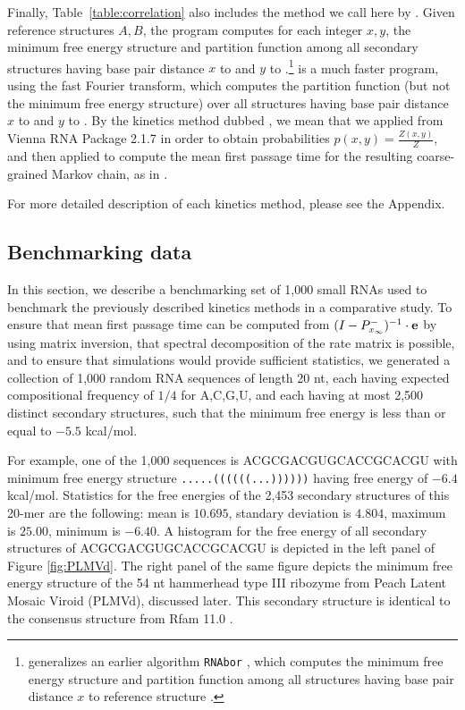 Finally, Table~\ref{table:correlation}
also includes the method we call here by \rnatwofold.
Given reference structures $A,B$, the \rnatwofold  program
\cite{hofacker:RNAbor2D,Lorenz.amb11} computes for each integer
$x,y$, the minimum free energy structure and partition function
among all secondary structures having base pair distance $x$ to \strA
and $y$ to \strB.\footnote{\rnatwofold generalizes an earlier algorithm
{\tt RNAbor} \cite{Freyhult.b07,Freyhult.nar07}, which computes the
minimum free energy structure and partition function among all structures
having base pair distance $x$ to reference structure \strA.}
\ffttwo \cite{Senter.jmb14} is a much faster program, using the
fast Fourier transform, which
computes the partition function (but not the minimum free energy
structure) over all structures having base pair distance $x$ to \strA and
$y$ to \strB. By the kinetics method dubbed
\rnatwofold, we mean that we applied
\rnatwofold from Vienna RNA Package 2.1.7
\cite{hofacker:RNAbor2D,Lorenz.amb11} in order
to obtain probabilities $p(x,y) = \frac{Z(x,y)}{Z}$,
and then applied \hermes to compute the mean first passage time for
the resulting coarse-grained Markov chain, as in \fftmfpt.

For more detailed description of each kinetics method, please see
the Appendix.

\subsection{Benchmarking data}

In this section, we describe a
benchmarking set of 1,000 small RNAs used to benchmark the previously
described kinetics methods in a comparative study. To ensure that mean
first passage time can be computed from
$(I - P^{-}_{x_{\infty}})^{-1} \cdot {\bf e}$ by using matrix
inversion, that spectral decomposition of the rate matrix is possible,
and to ensure that \kinfold simulations would provide sufficient
statistics, we generated a collection of 1,000 random RNA sequences of
length 20 nt, each having expected compositional frequency of $1/4$
for A,C,G,U, and each having at most 2,500 distinct secondary
structures, such that the minimum free energy is less than or equal to
$-5.5$ kcal/mol.

For example, one of the 1,000 sequences is ACGCGACGUGCACCGCACGU with
minimum free energy structure {\tt .....((((((...))))))} having free
energy of $-6.4$ kcal/mol. Statistics for the free energies of the
2,453 secondary structures of this 20-mer are the following: mean is
$10.695$, standary deviation is $4.804$, maximum is $25.00$, minimum
is $-6.40$. A histogram for the free energy of all secondary
structures of ACGCGACGUGCACCGCACGU is depicted in
the left panel of Figure \ref{fig:PLMVd}. The right panel of the
same figure depicts the minimum free energy structure of the
54 nt hammerhead type III ribozyme from Peach Latent Mosaic Viroid
(PLMVd), discussed later. This secondary structure is identical
to the consensus structure from Rfam 11.0 \cite{Gardner.nar11}.


